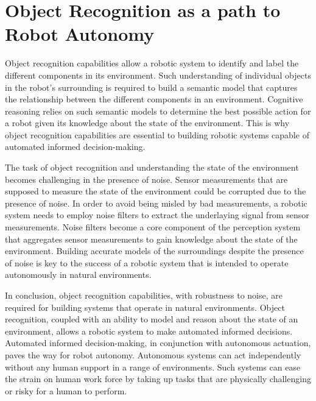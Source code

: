 \section{Object Recognition as a path to Robot Autonomy}

Object recognition capabilities allow a robotic system to identify and label the different components in its environment. Such understanding of individual objects in the robot's surrounding is required to build a semantic model that captures the relationship between the different components in an environment.
Cognitive reasoning relies on such semantic models to determine the best possible action for a robot given its knowledge about the state of the environment. This is why object recognition capabilities are essential to building robotic systems capable of automated informed decision-making.

The task of object recognition and understanding the state of the environment becomes challenging in the presence of noise. Sensor measurements
that are supposed to measure the state of the environment could be corrupted due to the presence of noise. In order to avoid being misled by bad measurements,
a robotic system needs to employ noise filters to extract the underlaying signal from sensor measurements. Noise filters become a core component of the perception system that aggregates sensor measurements to gain knowledge about the state of the environment. Building accurate models of the surroundings despite the presence of noise is key to the success of a robotic system that is intended to operate autonomously in natural environments.

In conclusion, object recognition capabilities, with robustness to noise, are required for building systems that operate in natural environments. Object recognition, coupled with an ability to model and reason about the state of an environment, allows a robotic system to make automated informed decisions. Automated informed decision-making, in conjunction with autonomous actuation, paves the way for robot autonomy. Autonomous systems can act independently without any human support in a range of environments. Such systems can ease the strain on human work force by taking up tasks that are physically challenging or risky for a human to perform.

